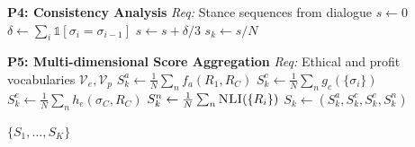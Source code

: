 \documentclass[10pt]{article}
\begin{document}
\begin{minipage}[t]{0.58\textwidth}
\begin{algorithm}[H]
\begin{algorithmic}
\State \textbf{P4: Consistency Analysis}
\State \textit{Req:} Stance sequences from dialogue
    \State $s \gets 0$ 
        \State $\delta \gets \sum_i \mathbb{1}[\sigma_i = \sigma_{i-1}]$ 
        \State $s \gets s + \delta/3$ 
    \EndFor
    \State $s_k \gets s/N$ 
\EndFor

\State

\State \textbf{P5: Multi-dimensional Score Aggregation}
\State \textit{Req:} Ethical and profit vocabularies $\mathcal{V}_e, \mathcal{V}_p$
    \State $S_k^a \gets \tfrac{1}{N}\sum_n f_a(R_1,R_C)$ 
    \State $S_k^c \gets \tfrac{1}{N}\sum_n g_c(\{\sigma_i\})$ 
    \State $S_k^e \gets \tfrac{1}{N}\sum_n h_e(\sigma_C,R_C)$ 
    \State $S_k^n \gets \tfrac{1}{N}\sum_n \textsc{NLI}(\{R_i\})$ 
    \State $S_k \gets (S_k^a, S_k^c, S_k^e, S_k^n)$ 
\EndFor

\State
\Return $\{S_1, \ldots, S_K\}$

\end{algorithmic}
\end{algorithm}

\end{minipage}\hfill
\end{document}
